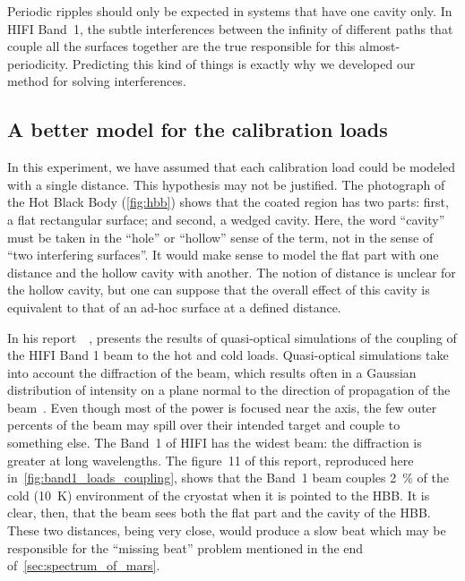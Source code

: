 Periodic ripples should only be expected in systems that have one cavity only.
In HIFI Band~1, the subtle interferences between the infinity of different paths that couple all the surfaces together are the true responsible for this almost-periodicity.
Predicting this kind of things is exactly why we developed our method for solving interferences.

\subsection{A better model for the calibration loads}
In this experiment, we have assumed that each calibration load could be modeled with a single distance.
This hypothesis may not be justified.
The photograph of the Hot Black Body (\cref{fig:hbb}) shows that the coated region has two parts:
first, a flat rectangular surface; and second, a wedged cavity.
Here, the word ``cavity'' must be taken in the ``hole'' or ``hollow'' sense of the term, not in the sense of ``two interfering surfaces''.
It would make sense to model the flat part with one distance and the hollow cavity with another.
The notion of distance is unclear for the hollow cavity, but one can suppose that the overall effect of this cavity is equivalent to that of an ad-hoc surface at a defined distance.

In his report~~\cite{jellema2003csa}, \citeauthor{jellema2003csa} presents the results of quasi-optical simulations of the coupling of the HIFI Band 1 beam to the hot and cold loads.
Quasi-optical simulations take into account the diffraction of the beam, which results often in a Gaussian distribution of intensity on a plane normal to the direction of propagation of the beam~\cite{goldsmith1998quasioptical}.
Even though most of the power is focused near the axis, the few outer percents of the beam may spill over their intended target and couple to something else.
The Band~1 of HIFI has the widest beam: the diffraction is greater at long wavelengths.
The figure~11 of this report, reproduced here in~\cref{fig:band1_loads_coupling}, shows that the Band~1 beam couples \SI{2}{\percent} of the cold (\SI{10}{\kelvin}) environment of the cryostat when it is pointed to the HBB.
It is clear, then, that the beam sees both the flat part and the cavity of the HBB.
These two distances, being very close, would produce a slow beat which may be responsible for the ``missing beat'' problem mentioned in the end of~\cref{sec:spectrum_of_mars}.


